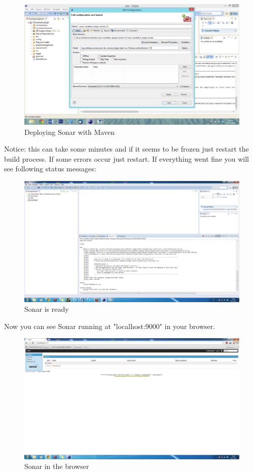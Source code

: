 \begin{figure}[h]
	\centering
		\includegraphics[width=\textwidth]{sonardeploy}
	\caption{Deploying Sonar with Maven}
	\label{fig:sonardeploy}
\end{figure}
 
Notice: this can take some minutes and if it seems to be frozen just restart the build process. If some errors occur just restart.
If everything went fine you will see following status messages:
 
\begin{figure}[h]
	\centering
		\includegraphics[width=\textwidth]{sonarready}
	\caption{Sonar is ready}
	\label{fig:sonarready}
\end{figure}

Now you can see Sonar running at "localhost:9000"  in your browser.

\begin{figure}[h]
	\centering
		\includegraphics[width=\textwidth]{sonarrunning}
	\caption{Sonar in the browser}
	\label{fig:sonarrunning}
\end{figure}



